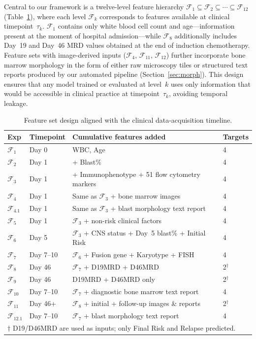 \documentclass[pdflatex,sn-nature]{sn-jnl}
\begin{document}
Central to our framework is a twelve-level feature hierarchy
$\mathcal{F}_1 \subseteq \mathcal{F}_2 \subseteq \cdots \subseteq
\mathcal{F}_{12}$ (Table~\ref{tab:expdesign}), where each level
$\mathcal{F}_k$ corresponds to features available at clinical
timepoint~$\tau_k$.
$\mathcal{F}_1$ contains only white blood cell count and age—information
present at the moment of hospital admission—while $\mathcal{F}_{8}$
additionally includes Day~19 and Day~46 MRD values obtained at the
end of induction chemotherapy.
Feature sets with image-derived inputs ($\mathcal{F}_4$, $\mathcal{F}_{11}$,
$\mathcal{F}_{12}$) further incorporate bone marrow morphology in the
form of either raw microscopy tiles or structured text reports produced
by our automated pipeline (Section~\ref{sec:morph}).
This design ensures that any model trained or evaluated at level~$k$
uses only information that would be accessible in clinical practice at
timepoint~$\tau_k$, avoiding temporal leakage.

\begin{table}[ht]
\caption{Feature set design aligned with the clinical data-acquisition timeline.}
\label{tab:expdesign}
\centering
\small
\begin{tabular}{llp{7cm}l}
\toprule
\textbf{Exp} & \textbf{Timepoint} & \textbf{Cumulative features added} & \textbf{Targets} \\
\midrule
$\mathcal{F}_1$ & Day 0 & WBC, Age & 4 \\
$\mathcal{F}_2$ & Day 1 & + Blast\% & 4 \\
$\mathcal{F}_3$ & Day 1 & + Immunophenotype + 51 flow cytometry markers & 4 \\
$\mathcal{F}_{4}$ & Day 1 & Same as $\mathcal{F}_3$ + bone marrow images & 4 \\
$\mathcal{F}_{4.1}$ & Day 1 & Same as $\mathcal{F}_3$ + blast morphology text report & 4 \\
$\mathcal{F}_5$ & Day 1 & $\mathcal{F}_3$ + non-risk clinical factors & 4 \\
$\mathcal{F}_6$ & Day 5 & $\mathcal{F}_3$ + CNS status + Day~5 blast\% + Initial Risk & 4 \\
$\mathcal{F}_7$ & Day 7--10 & $\mathcal{F}_6$ + Fusion gene + Karyotype + FISH & 4 \\
$\mathcal{F}_8$ & Day 46 & $\mathcal{F}_7$ + D19MRD + D46MRD & 2$^\dagger$ \\
$\mathcal{F}_9$ & Day 46 & D19MRD + D46MRD only & 2$^\dagger$ \\
$\mathcal{F}_{10}$ & Day 7--10 & $\mathcal{F}_7$ + diagnostic bone marrow text report & 4 \\
$\mathcal{F}_{11}$ & Day 46+ & $\mathcal{F}_8$ + initial + follow-up images \& reports & 2$^\dagger$ \\
$\mathcal{F}_{12.1}$ & Day 7--10 & $\mathcal{F}_7$ + blast morphology text report & 4 \\
\bottomrule
\multicolumn{4}{l}{$\dagger$ D19/D46MRD are used as inputs; only Final Risk and Relapse predicted.}
\end{tabular}
\end{table}
\end{document}
